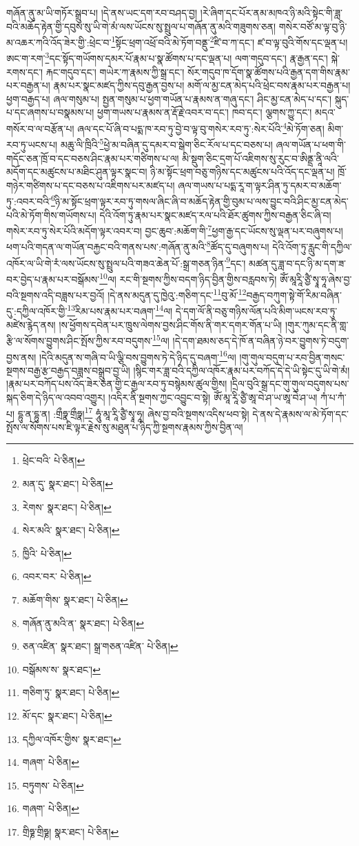 གཞོན་ནུ་མ་ཡི་གཏོར་སྒྲུབ་པ། །དེ་ནས་ཡང་དག་རབ་བཤད་བྱ། །རེ་ཞིག་དང་པོར་ནམ་མཁའ་ཉི་མའི་སྟེང་གི་ཟླ་བའི་མཆོད་རྟེན་གྱི་དབུས་སུ་ཡི་གེ་མཾ་ལས་ཡོངས་སུ་སྤྲུལ་པ་གཞོན་ནུ་མའི་གཟུགས་ཅན། གསེར་བཙོ་མ་ལྟ་བུ་ཉི་མ་འཆར་ཀའི་འོད་ཟེར་གྱི་:ཕྲེང་བ་\footnote{ཕྲེང་བའི་  པེ་ཅིན། }སྟོང་ཕྲག་འཕྲོ་བའི་མེ་ཏོག་བནྡུ་\footnote{མན་དུ་  སྣར་ཐང་།  པེ་ཅིན། }ཛི་བ་ཀ་དང་། ཛ་བ་ལྟ་བུའི་གོས་དང་ལྡན་པ། ཨང་ག་རག་\footnote{རེགས་  སྣར་ཐང་།  པེ་ཅིན། }དང་སྟོད་གཡོགས་དམར་པོ་རྣམ་པ་སྣ་ཚོགས་པ་དང་ལྡན་པ། ལག་གདུབ་དང་། རྣ་རྒྱན་དང་། སྐེ་རགས་དང་། རྐང་གདུབ་དང་། གཡེར་ཀ་རྣམས་ཀྱི་སྒྲ་དང་། སོར་གདུབ་ཁ་དོག་སྣ་ཚོགས་པའི་རྒྱན་དག་གིས་རྣམ་པར་བརྒྱན་པ། རྣམ་པར་སྣང་མཛད་ཀྱིས་དབུ་རྒྱན་བྱས་པ། མགོ་ལ་མྱ་ངན་མེད་པའི་ཕྲེང་བས་རྣམ་པར་བརྒྱན་པ། ཕྱག་བརྒྱད་པ། ཞལ་གསུམ་པ། སྤྱན་གསུམ་པ་ཕྱག་གཡོན་པ་རྣམས་ན་གཞུ་དང་། ཤིང་མྱ་ངན་མེད་པ་དང་། སྐུད་པ་དང་ཞགས་པ་བསྣམས་པ། ཕྱག་གཡས་པ་རྣམས་ན་རྡོ་རྗེ་འབར་བ་དང་། ཁབ་དང་། ལྕགས་ཀྱུ་དང་། མདའ་གསོར་བ་ལ་བརྩོན་པ། ཞལ་དང་པོ་ཞི་བ་པདྨ་ཁ་རབ་ཏུ་བྱེ་བ་ལྟ་བུ་གསེར་རབ་ཏུ་:སེར་པོའི་\footnote{སེར་མའི་  སྣར་ཐང་།  པེ་ཅིན། }མེ་ཏོག་ཅན། མིག་རབ་ཏུ་ཡངས་པ། མཆུ་ལི་ཁྲིའི་\footnote{ཁྱིའི་  པེ་ཅིན། }ཕྱེ་མ་བཞིན་དུ་དམར་བ་སྒེག་ཅིང་རོལ་པ་དང་བཅས་པ། ཞལ་གཡོན་པ་ཕག་གི་གདོང་ཅན་ཁྲོ་བ་དང་བཅས་ཤིང་རྣམ་པར་གཙིགས་པ་ལ། མི་སྡུག་ཅིང་དྲག་པོ་འཇིགས་སུ་རུང་བ་ཨིནྡྲ་ནཱི་ལའི་མདོག་དང་མཚུངས་པ་མཐིང་ཤུན་ལྟར་སྣང་བ། ཉི་མ་སྟོང་ཕྲག་བཅུ་གཉིས་དང་མཚུངས་པའི་འོད་དང་ལྡན་པ། ཁྲོ་གཉེར་གཙིགས་པ་དང་བཅས་པ་འཇིགས་པར་མཛད་པ། ཞལ་གཡས་པ་པདྨ་རཱ་ག་ལྟར་ཤིན་ཏུ་དམར་བ་མཆོག་ཏུ་:འབར་བའི་\footnote{འབར་བར་  པེ་ཅིན། }ཉི་མ་སྟོང་ཕྲག་ལྟར་རབ་ཏུ་གསལ་ཞིང་ཞི་བ་མཆོད་རྟེན་གྱི་བུམ་པ་ལས་བྱུང་བའི་ཤིང་མྱ་ངན་མེད་པའི་མེ་ཏོག་གིས་གཡོགས་པ། དེའི་འོག་ཏུ་རྣམ་པར་སྣང་མཛད་རལ་པའི་ཐོར་ཚུགས་ཀྱིས་བརྒྱན་ཅིང་ཞི་བ། གསེར་རབ་ཏུ་སེར་པོའི་མདོག་ལྟར་འབར་བ། བྱང་ཆུབ་:མཆོག་གི་\footnote{མཆོག་གིས་  སྣར་ཐང་།  པེ་ཅིན། }ཕྱག་རྒྱ་དང་ཡོངས་སུ་ལྡན་པར་བཞུགས་པ། ཕག་པའི་གདན་ལ་གཡོན་བརྐྱང་བའི་གནས་པས་:གཞོན་ནུ་མའི་\footnote{གཞོན་ནུ་མའི་ན་  སྣར་ཐང་།  པེ་ཅིན། }ཚོད་དུ་བཞུགས་པ། དེའི་འོག་ཏུ་རླུང་གི་དཀྱིལ་འཁོར་ལ་ཡི་གེ་རཾ་ལས་ཡོངས་སུ་སྤྲུལ་པའི་གཟའ་ཆེན་པོ་:སྒྲ་གཅན་ཉིན་\footnote{ཅན་འཛིན་  སྣར་ཐང་། སྒྲ་གཅན་འཛིན་  པེ་ཅིན། }དང་། མཚན་དུ་ཟླ་བ་དང་ཉི་མ་དག་ཟ་བར་བྱེད་པ་རྣམ་པར་བསྒོམས་\footnote{བསྒོམས་ས་  སྣར་ཐང་། }ལ། རང་གི་སྔགས་ཀྱིས་བདག་ཉིད་བྱིན་གྱིས་བརླབས་ཏེ། ཨོཾ་མཱརཱི་ཙྱཻ་སྭཱ་ཧཱ་ཞེས་བྱ་བའི་སྔགས་འདི་བཟླས་པར་བྱའོ། །དེ་ནས་མདུན་དུ་ཁྱེའུ་:གཅིག་དང་\footnote{གཅིག་ཏུ་  སྣར་ཐང་།  པེ་ཅིན། }བུ་མོ་\footnote{མོ་དང་  སྣར་ཐང་།  པེ་ཅིན། }བརྒྱད་བཀུག་སྟེ་གོ་རིམ་བཞིན་དུ་:དཀྱིལ་འཁོར་གྱི་\footnote{དཀྱིལ་འཁོར་གྱིས་  སྣར་ཐང་། }རིམ་པས་རྣམ་པར་བཞག་\footnote{གཞག་  པེ་ཅིན། }ལ། དེ་དག་ལོ་ནི་བཅུ་གཉིས་ལོན་པའི་མིག་ཡངས་རབ་ཏུ་མཛེས་རྙེད་ནས། །ས་ཕྱོགས་དབེན་པར་ཁྲུས་ལེགས་བྱས་ཤིང་གོས་ནི་གར་དགར་གོན་པ་ཡི། །གུར་ཀུམ་དང་ནི་གླ་རྩི་ལ་སོགས་བྱུགས་ཤིང་སྤོས་ཀྱིས་རབ་བདུགས་\footnote{བཏུགས་  པེ་ཅིན། }ལ། །དེ་དག་ཐམས་ཅད་དེ་ཁོ་ན་བཞིན་ཉེ་བར་བྱུགས་ཏེ་བདུག་བྱས་ནས། །དེའི་མདུན་ས་གཞི་བ་ཡི་ལྕི་བས་བྱུགས་ཏེ་དེ་ཉིད་དུ་བཞག་\footnote{གཞག་  པེ་ཅིན། }ལ། །གུ་གུལ་བདུག་པ་རབ་བྱིན་གསང་སྔགས་བརྒྱ་རྩ་བརྒྱད་བཟླས་བསྒྲུབ་བྱ་ཡི། །སྙིང་གར་ཟླ་བའི་དཀྱིལ་འཁོར་རྣམ་པར་བཀོད་དེ་དེ་ཡི་སྟེང་དུ་ཡི་གེ་མཾ། །རྣམ་པར་བཀོད་པས་འོད་ཟེར་ཅན་གྱི་ང་རྒྱལ་རབ་ཏུ་བསྙེམས་ཚུལ་གྱིས། །དྲིལ་བུའི་སྒྲ་དང་གུ་གུལ་བདུགས་པས་སྐད་ཅིག་དེ་ཉིད་ལ་འབབ་འགྱུར། །འདིར་ནི་སྔགས་ཀྱང་འབྱུང་བ་སྟེ། ཨོཾ་མཱ་རཱི་ཙྱཻ་ཨཱ་བེ་ཤ་ཡ་ཨཱ་བེ་ཤ་ཡ། ཀཾ་པ་ཀཾ་པ། དྷུ་ན་དྷུ་ན། :གྲྀཧྣ་གྲྀཧྣ།\footnote{གྲིཧྞ་གྲིཧྞ།  སྣར་ཐང་།  པེ་ཅིན། } ཧཱུཾ་མཱ་རཱི་ཙྱཻ་སྭཱ་ཧཱ། ཞེས་བྱ་བའི་སྔགས་འདིས་ཕབ་སྟེ། དེ་ནས་དེ་རྣམས་ལ་མེ་ཏོག་དང་སྤོས་ལ་སོགས་པས་ཇི་ལྟར་རྗེས་སུ་མཐུན་པ་ཉིད་ཀྱི་སྔགས་རྣམས་ཀྱིས་བྱིན་ལ། 